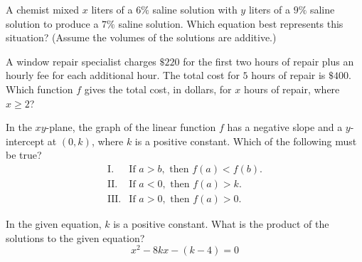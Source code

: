 \noindent\markforreview
\vspace{1em}

A chemist mixed \(x\) liters of a \(6\%\) saline solution with \(y\) liters of a
\(9\%\) saline solution to produce a \(7\%\) saline solution. Which equation best
represents this situation? (Assume the volumes of the solutions are additive.)

\vspace{2em}

\noindent\markforreview
\vspace{1em}

A window repair specialist charges \(\$220\) for the first two hours of repair
plus an hourly fee for each additional hour. The total cost for \(5\) hours of
repair is \(\$400\). Which function \(f\) gives the total cost, in dollars, for
\(x\) hours of repair, where \(x\ge 2\)?

\newpage

\noindent\markforreview
\vspace{1em}

In the \(xy\)-plane, the graph of the linear function \(f\) has a negative slope
and a \(y\)-intercept at \((0,k)\), where \(k\) is a positive constant. Which of
the following must be true?
\[
\begin{array}{ll}
\text{I.} & \text{If }a>b,\text{ then }f(a)<f(b).\\
\text{II.} & \text{If }a<0,\text{ then }f(a)>k.\\
\text{III.} & \text{If }a>0,\text{ then }f(a)>0.
\end{array}
\]

\vspace{2em}

\noindent\markforreview
\vspace{1em}

In the given equation, \(k\) is a positive constant. What is the product of the
solutions to the given equation?
\[
x^2-8kx-(k-4)=0
\]

\newpage

